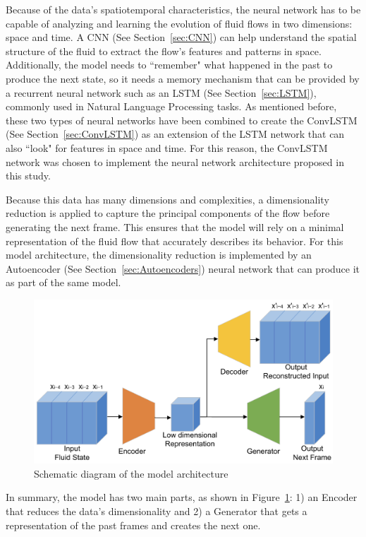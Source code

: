 Because of the data's spatiotemporal characteristics, the neural network has to be capable of analyzing and learning the evolution of fluid flows in two dimensions: space and time. A CNN (See Section~\ref{sec:CNN}) can help understand the spatial structure of the fluid to extract the flow's features and patterns in space. Additionally, the model needs to ``remember" what happened in the past to produce the next state, so it needs a memory mechanism that can be provided by a recurrent neural network such as an LSTM (See Section~\ref{sec:LSTM}), commonly used in Natural Language Processing tasks. As mentioned before, these two types of neural networks have been combined to create the ConvLSTM (See Section~\ref{sec:ConvLSTM}) as an extension of the LSTM network that can also ``look" for features in space and time. For this reason, the ConvLSTM network was chosen to implement the neural network architecture proposed in this study.

Because this data has many dimensions and complexities, a dimensionality reduction is applied to capture the principal components of the flow before generating the next frame. This ensures that the model will rely on a minimal representation of the fluid flow that accurately describes its behavior. For this model architecture, the dimensionality reduction is implemented by an Autoencoder (See Section~\ref{sec:Autoencoders}) neural network that can produce it as part of the same model.

\begin{figure}[!htbp]
    \centering
    \includegraphics[width=0.8\linewidth]{images/model_schematic.png}
    \caption{Schematic diagram of the model architecture}
    \label{fig:model_schematic}
\end{figure}

In summary, the model has two main parts, as shown in Figure~\ref{fig:model_schematic}: 1) an Encoder that reduces the data's dimensionality and 2) a Generator that gets a representation of the past frames and creates the next one.

